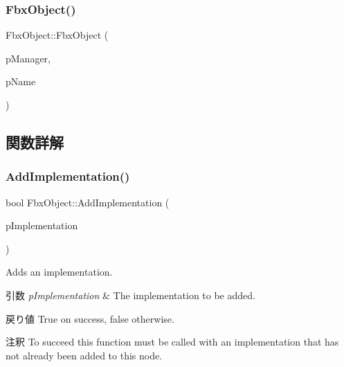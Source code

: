 \subsubsection{\texorpdfstring{Fbx\+Object()}{FbxObject()}}
{\footnotesize\ttfamily Fbx\+Object\+::\+Fbx\+Object (\begin{DoxyParamCaption}\item[{\hyperlink{class_fbx_manager}{Fbx\+Manager} \&}]{p\+Manager,  }\item[{const char $\ast$}]{p\+Name }\end{DoxyParamCaption})\hspace{0.3cm}{\ttfamily [protected]}}



\subsection{関数詳解}
\mbox{\label{class_fbx_object_a83138088781da53eb6fc3e3793ca9171}} 
\subsubsection{\texorpdfstring{Add\+Implementation()}{AddImplementation()}}
{\footnotesize\ttfamily bool Fbx\+Object\+::\+Add\+Implementation (\begin{DoxyParamCaption}\item[{\hyperlink{class_fbx_implementation}{Fbx\+Implementation} $\ast$}]{p\+Implementation }\end{DoxyParamCaption})}

Adds an implementation. 
\begin{DoxyParams}{引数}
{\em p\+Implementation} & The implementation to be added. \\
\hline
\end{DoxyParams}
\begin{DoxyReturn}{戻り値}
{\ttfamily True} on success, {\ttfamily false} otherwise. 
\end{DoxyReturn}
\begin{DoxyRemark}{注釈}
To succeed this function must be called with an implementation that has not already been added to this node. 
\end{DoxyRemark}
\mbox{\label{class_fbx_object_ad553a4262b09cb57c3171a93edadbab8}} 

